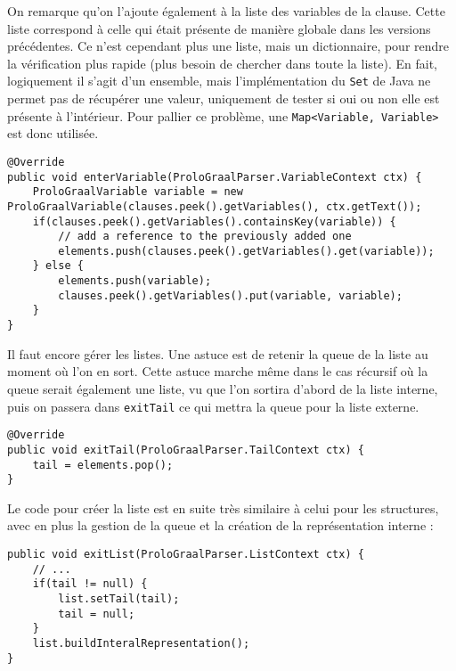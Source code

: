 \documentclass[../report.tex]{subfiles}
\begin{document}
On remarque qu'on l'ajoute également à la liste des variables de la clause. Cette liste correspond à celle qui était présente de manière globale dans les versions précédentes. Ce n'est cependant plus une liste, mais un dictionnaire, pour rendre la vérification plus rapide (plus besoin de chercher dans toute la liste). En fait, logiquement il s'agit d'un ensemble, mais l'implémentation du \texttt{Set} de Java ne permet pas de récupérer une valeur, uniquement de tester si oui ou non elle est présente à l'intérieur. Pour pallier ce problème, une \texttt{Map<Variable, Variable>} est donc utilisée.
\begin{verbatim}
@Override
public void enterVariable(ProloGraalParser.VariableContext ctx) {
    ProloGraalVariable variable = new ProloGraalVariable(clauses.peek().getVariables(), ctx.getText());
    if(clauses.peek().getVariables().containsKey(variable)) {
        // add a reference to the previously added one
        elements.push(clauses.peek().getVariables().get(variable)); 
    } else {
        elements.push(variable);
        clauses.peek().getVariables().put(variable, variable);
    }
}
\end{verbatim}
Il faut encore gérer les listes. Une astuce est de retenir la queue de la liste au moment où l'on en sort. Cette astuce marche même dans le cas récursif où la queue serait également une liste, vu que l'on sortira d'abord de la liste interne, puis on passera dans \texttt{exitTail} ce qui mettra la queue pour la liste externe.
\begin{verbatim}
@Override 
public void exitTail(ProloGraalParser.TailContext ctx) {
    tail = elements.pop();
}
\end{verbatim}
Le code pour créer la liste est en suite très similaire à celui pour les structures, avec en plus la gestion de la queue et la création de la représentation interne :
\begin{verbatim}
public void exitList(ProloGraalParser.ListContext ctx) {
    // ...
    if(tail != null) {
        list.setTail(tail);
        tail = null;
    }
    list.buildInteralRepresentation();
}
\end{verbatim}
\end{document}
